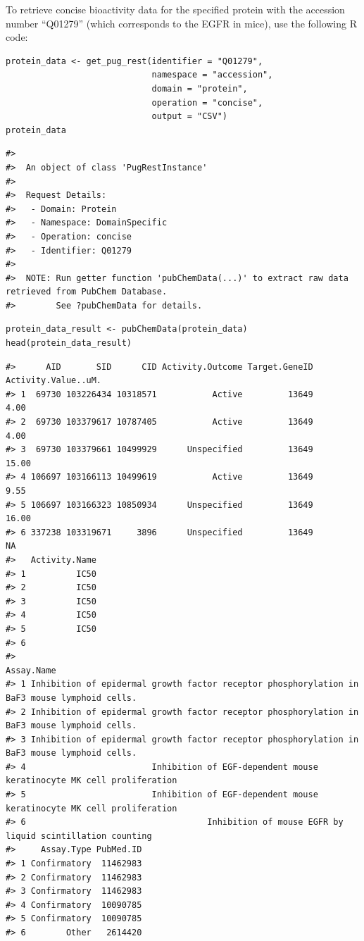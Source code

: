 To retrieve concise bioactivity data for the specified protein with the accession number ``Q01279'' (which corresponds to the EGFR in mice), use the following R code:

\begin{verbatim}
protein_data <- get_pug_rest(identifier = "Q01279", 
                             namespace = "accession", 
                             domain = "protein", 
                             operation = "concise", 
                             output = "CSV")
protein_data
\end{verbatim}

\begin{verbatim}
#> 
#>  An object of class 'PugRestInstance'
#> 
#>  Request Details:  
#>   - Domain: Protein
#>   - Namespace: DomainSpecific
#>   - Operation: concise
#>   - Identifier: Q01279
#> 
#>  NOTE: Run getter function 'pubChemData(...)' to extract raw data retrieved from PubChem Database. 
#>        See ?pubChemData for details.
\end{verbatim}

\begin{verbatim}
protein_data_result <- pubChemData(protein_data)
head(protein_data_result)
\end{verbatim}

\begin{verbatim}
#>      AID       SID      CID Activity.Outcome Target.GeneID Activity.Value..uM.
#> 1  69730 103226434 10318571           Active         13649                4.00
#> 2  69730 103379617 10787405           Active         13649                4.00
#> 3  69730 103379661 10499929      Unspecified         13649               15.00
#> 4 106697 103166113 10499619           Active         13649                9.55
#> 5 106697 103166323 10850934      Unspecified         13649               16.00
#> 6 337238 103319671     3896      Unspecified         13649                  NA
#>   Activity.Name
#> 1          IC50
#> 2          IC50
#> 3          IC50
#> 4          IC50
#> 5          IC50
#> 6              
#>                                                                                     Assay.Name
#> 1 Inhibition of epidermal growth factor receptor phosphorylation in BaF3 mouse lymphoid cells.
#> 2 Inhibition of epidermal growth factor receptor phosphorylation in BaF3 mouse lymphoid cells.
#> 3 Inhibition of epidermal growth factor receptor phosphorylation in BaF3 mouse lymphoid cells.
#> 4                         Inhibition of EGF-dependent mouse keratinocyte MK cell proliferation
#> 5                         Inhibition of EGF-dependent mouse keratinocyte MK cell proliferation
#> 6                                    Inhibition of mouse EGFR by liquid scintillation counting
#>     Assay.Type PubMed.ID
#> 1 Confirmatory  11462983
#> 2 Confirmatory  11462983
#> 3 Confirmatory  11462983
#> 4 Confirmatory  10090785
#> 5 Confirmatory  10090785
#> 6        Other   2614420
\end{verbatim}

